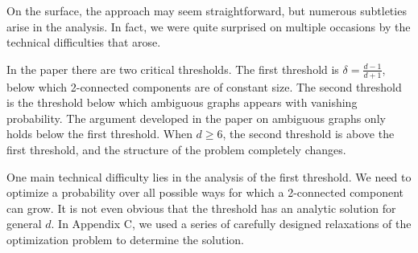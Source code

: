\documentclass[12pt]{colt2024} %
\begin{document}
On the surface, the approach may seem straightforward, but numerous subtleties arise in the analysis. In fact, we were quite surprised on multiple occasions by the technical difficulties that arose. 

In the paper there are two critical thresholds. The first threshold is $\delta=\frac{d-1}{d+1}$, below which 2-connected components are of constant size. The second threshold is the threshold below which ambiguous graphs appears with vanishing probability. The argument developed in the paper on ambiguous graphs only holds below the first threshold. When $d\ge 6$, the second threshold is above the first threshold, and the structure of the problem completely changes. 

One main technical difficulty lies in the analysis of the first threshold. We need to optimize a probability over all possible ways for which a 2-connected component can grow. It is not even obvious that the threshold has an analytic solution for general $d$. In Appendix C, we used a series of carefully designed relaxations of the optimization problem to determine the solution. 
\end{document}
